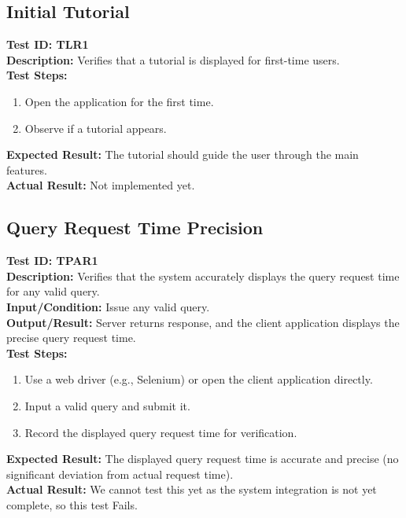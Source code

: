 \documentclass[12pt, titlepage]{article}
\begin{document}
\subsection{Initial Tutorial}
\textbf{Test ID: TLR1}\\
\textbf{Description:} Verifies that a tutorial is displayed for first-time users.\\
\textbf{Test Steps:}
\begin{enumerate}
    \item Open the application for the first time.
    \item Observe if a tutorial appears.
\end{enumerate}
\textbf{Expected Result:} The tutorial should guide the user through the main features.\\
\textbf{Actual Result:} Not implemented yet.

\subsection{Query Request Time Precision}
\textbf{Test ID: TPAR1}\\
\textbf{Description:} Verifies that the system accurately displays the query request time for any valid query.\\
\textbf{Input/Condition:} Issue any valid query.\\
\textbf{Output/Result:} Server returns response, and the client application displays the precise query request time.\\
\textbf{Test Steps:}
\begin{enumerate}
    \item Use a web driver (e.g., Selenium) or open the client application directly.
    \item Input a valid query and submit it.
    \item Record the displayed query request time for verification.
\end{enumerate}
\textbf{Expected Result:} The displayed query request time is accurate and precise (no significant deviation from actual request time).\\
\textbf{Actual Result:} We cannot test this yet as the system integration is not yet complete, so this test Fails.
\end{document}
